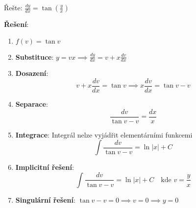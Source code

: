 \begin{example}
Řešte: $\frac{dy}{dx} = \tan\left(\frac{y}{x}\right)$
\vspace{0.3\baselineskip}

\textbf{Řešení}: 
\begin{enumerate}
\item $f(v) = \tan v$

\item \textbf{Substituce}: $y = vx \implies \frac{dy}{dx} = v + x\frac{dv}{dx}$

\item \textbf{Dosazení}:
\[
v + x\frac{dv}{dx} = \tan v \implies x\frac{dv}{dx} = \tan v - v
\]

\item \textbf{Separace}:
\[
\frac{dv}{\tan v - v} = \frac{dx}{x}
\]

\item \textbf{Integrace}: Integrál nelze vyjádřit elementárními funkcemi
\[
\int \frac{dv}{\tan v - v} = \ln|x| + C
\]

\item \textbf{Implicitní řešení}:
\[
\int \frac{dv}{\tan v - v} = \ln|x| + C \quad \text{kde } v = \frac{y}{x}
\]

\item \textbf{Singulární řešení}: $\tan v - v = 0 \implies v = 0 \implies y = 0$
\end{enumerate}
\end{example}

\vspace{0.6\baselineskip}


